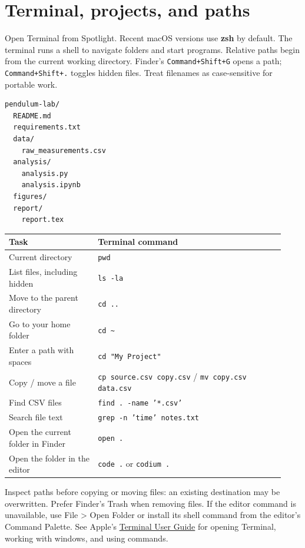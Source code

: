 \documentclass[11pt]{article}
\begin{document}
\section{Terminal, projects, and paths}
Open Terminal from Spotlight. Recent macOS versions use \textbf{zsh} by
default. The terminal runs a shell to navigate folders and start programs.
Relative paths begin from the current working directory. Finder's
\texttt{Command+Shift+G} opens a path; \texttt{Command+Shift+.} toggles hidden
files. Treat filenames as case-sensitive for portable work.

\begin{lstlisting}
pendulum-lab/
  README.md
  requirements.txt
  data/
    raw_measurements.csv
  analysis/
    analysis.py
    analysis.ipynb
  figures/
  report/
    report.tex
\end{lstlisting}

\begin{longtable}{p{0.30\linewidth}p{0.63\linewidth}}
\toprule Task & Terminal command\\ \midrule
Current directory & \texttt{pwd}\\
List files, including hidden & \texttt{ls -la}\\
Move to the parent directory & \texttt{cd ..}\\
Go to your home folder & \texttt{cd \textasciitilde}\\
Enter a path with spaces & \texttt{cd "My Project"}\\
Copy / move a file & \texttt{cp source.csv copy.csv} / \texttt{mv copy.csv data.csv}\\
Find CSV files & \texttt{find . -name '*.csv'}\\
Search file text & \texttt{grep -n 'time' notes.txt}\\
Open the current folder in Finder & \texttt{open .}\\
Open the folder in the editor & \texttt{code .} or \texttt{codium .}\\
\bottomrule
\end{longtable}
Inspect paths before copying or moving files: an existing destination may be
overwritten. Prefer Finder's Trash when removing files. If the editor command
is unavailable, use File > Open Folder or install its shell command from the
editor's Command Palette.
See Apple's
\href{https://support.apple.com/guide/terminal/welcome/mac}{Terminal User
Guide} for opening Terminal, working with windows, and using commands.
\end{document}
